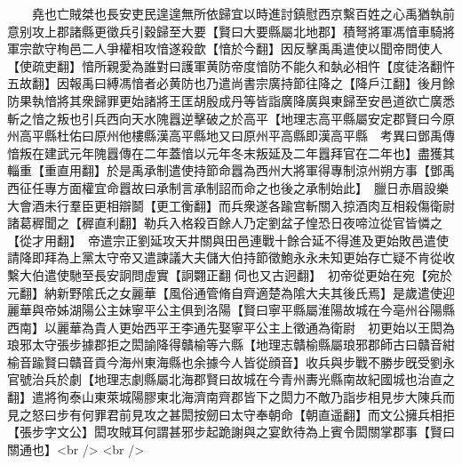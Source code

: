 　　堯也亡賊桀也長安吏民遑遑無所依歸宜以時進討鎮慰西京繫百姓之心禹猶執前意别攻上郡諸縣更徵兵引穀歸至大要【賢曰大要縣屬北地郡】積弩將軍馮愔車騎將軍宗歆守栒邑二人爭權相攻愔遂殺歆【愔於今翻】因反擊禹禹遣使以聞帝問使人【使疏吏翻】愔所親愛為誰對曰護軍黄防帝度愔防不能久和埶必相忤【度徒洛翻忤五故翻】因報禹曰縛馮愔者必黄防也乃遣尚書宗廣持節往降之【降戶江翻】後月餘防果執愔將其衆歸罪更始諸將王匡胡殷成丹等皆詣廣降廣與東歸至安邑道欲亡廣悉斬之愔之叛也引兵西向天水隗囂逆擊破之於高平【地理志高平縣屬安定郡賢曰今原州高平縣杜佑曰原州他樓縣漢高平縣地又曰原州平高縣即漢高平縣　考異曰鄧禹傳愔叛在建武元年隗囂傳在二年蓋愔以元年冬末叛延及二年囂拜官在二年也】盡獲其輜重【重直用翻】於是禹承制遣使持節命囂為西州大將軍得專制涼州朔方事【鄧禹西征任專方面權宜命囂故曰承制言承制詔而命之也後之承制始此】　臘日赤眉設樂大會酒未行羣臣更相辯鬬【更工衡翻】而兵衆遂各踰宫斬關入掠酒肉互相殺傷衛尉諸葛稺聞之【稺直利翻】勒兵入格殺百餘人乃定劉盆子惶恐日夜啼泣從官皆憐之【從才用翻】　帝遣宗正劉延攻天井關與田邑連戰十餘合延不得進及更始敗邑遣使請降即拜為上黨太守帝又遣諫議大夫儲大伯持節徵鮑永永未知更始存亡疑不肯從收繫大伯遣使馳至長安詗問虛實【詗翾正翻伺也又古迥翻】　初帝從更始在宛【宛於元翻】納新野隂氏之女麗華【風俗通管脩自齊適楚為隂大夫其後氏焉】是歲遣使迎麗華與帝姊湖陽公主妹寧平公主俱到洛陽【賢曰寧平縣屬淮陽故城在今亳州谷陽縣西南】以麗華為貴人更始西平王李通先娶寧平公主上徵通為衛尉　初更始以王閎為琅邪太守張步據郡拒之閎諭降得贛榆等六縣【地理志贛榆縣屬琅邪郡師古曰贛音紺榆音踰賢曰贛音貢今海州東海縣也余據今人皆從顔音】收兵與步戰不勝步旣受劉永官號治兵於劇【地理志劇縣屬北海郡賢曰故城在今青州夀光縣南故紀國城也治直之翻】遣將徇泰山東萊城陽膠東北海濟南齊郡皆下之閎力不敵乃詣步相見步大陳兵而見之怒曰步有何罪君前見攻之甚閎按劒曰太守奉朝命【朝直遥翻】而文公擁兵相拒【張步字文公】閎攻賊耳何謂甚邪步起跪謝與之宴飲待為上賓令閎關掌郡事【賢曰關通也】<br />
<br />
